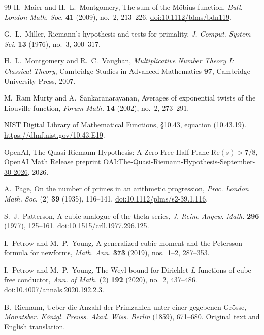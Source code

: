 \begin{thebibliography}{99}
H.~Maier and H.~L.~Montgomery,
The sum of the M\"obius function,
\emph{Bull. London Math. Soc.} \textbf{41} (2009), no.~2, 213--226.
\href{https://doi.org/10.1112/blms/bdn119}
{doi:10.1112/blms/bdn119}.

G.~L.~Miller,
Riemann's hypothesis and tests for primality,
\emph{J. Comput. System Sci.} \textbf{13} (1976), no.~3, 300--317.

H.~L.~Montgomery and R.~C.~Vaughan,
\emph{Multiplicative Number Theory I: Classical Theory},
Cambridge Studies in Advanced Mathematics \textbf{97},
Cambridge University Press, 2007.

M.~Ram Murty and A.~Sankaranarayanan,
Averages of exponential twists of the Liouville function,
\emph{Forum Math.} \textbf{14} (2002), no.~2, 273--291.

{\raggedright
NIST Digital Library of Mathematical Functions,
\S10.43, equation (10.43.19).
\href{https://dlmf.nist.gov/10.43.E19}{https://dlmf.nist.gov/10.43.E19}.
\par}

OpenAI,
The Quasi-Riemann Hypothesis: A Zero-Free Half-Plane $\mathrm{Re}(s)>7/8$,
OpenAI Math Release preprint
\href{https://github.com/openai/math/blob/main/preprints/The-Quasi-Riemann-Hypothesis-September-30-2026/paper.pdf}{OAI:The-Quasi-Riemann-Hypothesis-September-30-2026},
2026.

A.~Page,
On the number of primes in an arithmetic progression,
\emph{Proc. London Math. Soc.} (2) \textbf{39} (1935), 116--141.
\href{https://doi.org/10.1112/plms/s2-39.1.116}
{doi:10.1112/plms/s2-39.1.116}.

S.~J.~Patterson,
A cubic analogue of the theta series,
\emph{J. Reine Angew. Math.} \textbf{296} (1977), 125--161.
\href{https://doi.org/10.1515/crll.1977.296.125}
{doi:10.1515/crll.1977.296.125}.

I.~Petrow and M.~P.~Young,
A generalized cubic moment and the Petersson formula for newforms,
\emph{Math. Ann.} \textbf{373} (2019), nos.~1--2, 287--353.

I.~Petrow and M.~P.~Young,
The Weyl bound for Dirichlet $L$-functions of cube-free conductor,
\emph{Ann. of Math.} (2) \textbf{192} (2020), no.~2, 437--486.
\href{https://doi.org/10.4007/annals.2020.192.2.3}
{doi:10.4007/annals.2020.192.2.3}.

B.~Riemann,
Ueber die Anzahl der Primzahlen unter einer gegebenen Gr\"osse,
\emph{Monatsber. K\"onigl. Preuss. Akad. Wiss. Berlin}
(1859), 671--680.
\href{https://www.maths.tcd.ie/pub/HistMath/People/Riemann/Zeta/}
{Original text and English translation}.


\end{thebibliography}
